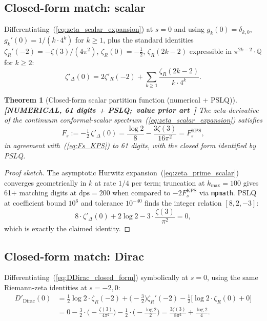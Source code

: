 \documentclass[11pt,a4paper]{article}
\theoremstyle{plain}
\newtheorem{theorem}{Theorem}[section]
\theoremstyle{definition}
\newcommand{\Q}{\mathbb{Q}}
\newcommand{\KPS}{\text{KPS}}
\begin{document}
\subsection{Closed-form match: scalar}
\label{subsec:scalar_match}

Differentiating~(\ref{eq:zeta_scalar_expansion}) at $s = 0$ and using
$g_{k}(0) = \delta_{k,0}$, $g_{k}'(0) = 1/(k \cdot 4^{k})$ for $k
\ge 1$, plus the standard identities $\zeta_{R}'(-2) = -\zeta(3)/(4
\pi^{2})$, $\zeta_{R}(0) = -\tfrac{1}{2}$, $\zeta_{R}(2k - 2)$
expressible in $\pi^{2k - 2} \cdot \Q$ for $k \ge 2$:
\begin{equation}
\zeta'_{\Delta}(0) = 2\zeta'_{R}(-2) + \sum_{k \ge 1} \frac{\zeta_{R}(2k - 2)}{k \cdot 4^{k}}.
\label{eq:zeta_prime_scalar}
\end{equation}

\begin{theorem}[Closed-form scalar partition function (numerical + PSLQ)]
\label{thm:scalar_bitexact}
\textbf{[NUMERICAL, 61 digits + PSLQ;\ value prior art~\cite{klebanov_pufu_safdi2011}]}
The zeta-derivative of the continuum conformal-scalar
spectrum~(\ref{eq:zeta_scalar_expansion}) satisfies
\begin{equation}
F_{s} := -\tfrac{1}{2}\,\zeta'_{\Delta}(0) = \frac{\log 2}{8} - \frac{3\zeta(3)}{16\pi^{2}} = F_{s}^{\KPS},
\end{equation}
in agreement with~(\ref{eq:Fs_KPS}) to 61 digits, with the closed form
identified by PSLQ.
\end{theorem}

\begin{proof}[Proof sketch]
The asymptotic Hurwitz expansion~(\ref{eq:zeta_prime_scalar})
converges geometrically in $k$ at rate $1/4$ per term;
truncation at $k_{\max} = 100$ gives 61+ matching digits at
$\mathrm{dps} = 200$ when compared to $-2 F_{s}^{\KPS}$ via
\texttt{mpmath}. PSLQ at coefficient bound $10^{6}$ and tolerance
$10^{-40}$ finds the integer relation $[8, 2, -3]$:
\[
8 \cdot \zeta'_{\Delta}(0) + 2 \log 2 - 3 \cdot \frac{\zeta(3)}{\pi^{2}} = 0,
\]
which is exactly the claimed identity.
\end{proof}

\subsection{Closed-form match: Dirac}
\label{subsec:dirac_match}

Differentiating~(\ref{eq:DDirac_closed_form}) symbolically at $s = 0$,
using the same Riemann-zeta identities at $s = -2, 0$:
\begin{align}
D'_{\mathrm{Dirac}}(0)
&= \tfrac{1}{2}\log 2 \cdot \zeta_{R}(-2) + \bigl(-\tfrac{3}{2}\bigr) \zeta_{R}'(-2)
- \tfrac{1}{2}\bigl[\log 2 \cdot \zeta_{R}(0) + 0\bigr] \\
&= 0 - \tfrac{3}{2} \cdot \bigl(-\tfrac{\zeta(3)}{4\pi^{2}}\bigr)
- \tfrac{1}{2} \cdot \bigl(-\tfrac{\log 2}{2}\bigr)
= \frac{3\zeta(3)}{8\pi^{2}} + \frac{\log 2}{4}.
\end{align}
\end{document}
